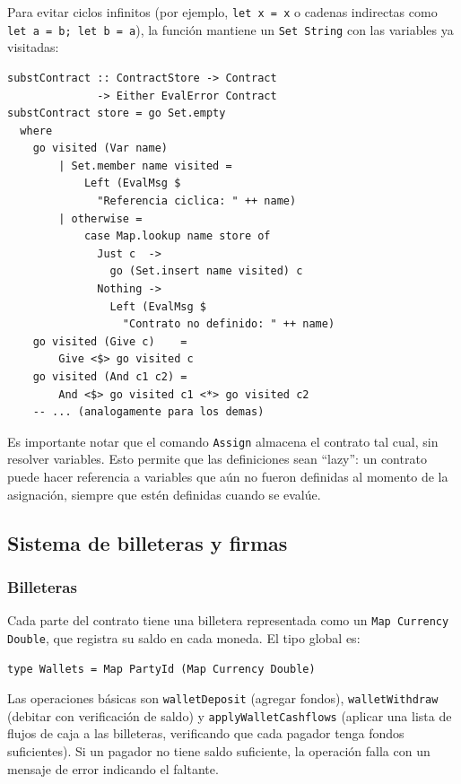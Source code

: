 \documentclass[a4paper, 12pt]{article}
\begin{document}
Para evitar ciclos infinitos (por ejemplo, \texttt{let x = x} o cadenas indirectas como \texttt{let a = b; let b = a}), la función mantiene un \texttt{Set String} con las variables ya visitadas:

\begin{lstlisting}[caption={Detección de ciclos en substContract (Evaluator.hs)}]
substContract :: ContractStore -> Contract
              -> Either EvalError Contract
substContract store = go Set.empty
  where
    go visited (Var name)
        | Set.member name visited =
            Left (EvalMsg $
              "Referencia ciclica: " ++ name)
        | otherwise =
            case Map.lookup name store of
              Just c  ->
                go (Set.insert name visited) c
              Nothing ->
                Left (EvalMsg $
                  "Contrato no definido: " ++ name)
    go visited (Give c)    =
        Give <$> go visited c
    go visited (And c1 c2) =
        And <$> go visited c1 <*> go visited c2
    -- ... (analogamente para los demas)
\end{lstlisting}

Es importante notar que el comando \texttt{Assign} almacena el contrato tal cual, sin resolver variables. Esto permite que las definiciones sean ``lazy'': un contrato puede hacer referencia a variables que aún no fueron definidas al momento de la asignación, siempre que estén definidas cuando se evalúe.

\subsection{Sistema de billeteras y firmas}

\subsubsection{Billeteras}

Cada parte del contrato tiene una billetera representada como un \texttt{Map Currency Double}, que registra su saldo en cada moneda. El tipo global es:

\begin{lstlisting}[caption={Tipo de billeteras (Types.hs)}]
type Wallets = Map PartyId (Map Currency Double)
\end{lstlisting}

Las operaciones básicas son \texttt{walletDeposit} (agregar fondos), \texttt{walletWithdraw} (debitar con verificación de saldo) y \texttt{applyWalletCashflows} (aplicar una lista de flujos de caja a las billeteras, verificando que cada pagador tenga fondos suficientes). Si un pagador no tiene saldo suficiente, la operación falla con un mensaje de error indicando el faltante.
\end{document}
